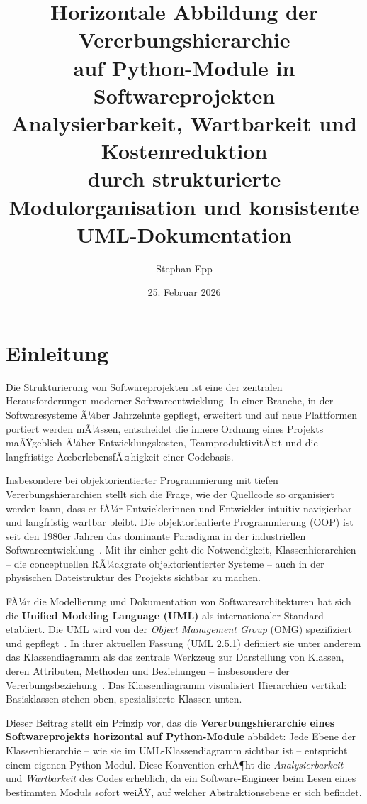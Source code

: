 ﻿\documentclass[a4paper,12pt]{article}
\title{
	\vspace{-1cm}
	\Large\textbf{Horizontale Abbildung der Vererbungshierarchie\\
		auf Python-Module in Softwareprojekten}\\[0.5em]
	\large Analysierbarkeit, Wartbarkeit und Kostenreduktion\\
	durch strukturierte Modulorganisation und konsistente UML-Dokumentation
}
\author{Stephan Epp}
\date{25. Februar 2026}
\begin{document}
	
\maketitle
\tableofcontents
\newpage

\section{Einleitung}

Die Strukturierung von Softwareprojekten ist eine der zentralen Herausforderungen
moderner Softwareentwicklung. In einer Branche, in der Softwaresysteme Ã¼ber
Jahrzehnte gepflegt, erweitert und auf neue Plattformen portiert werden mÃ¼ssen,
entscheidet die innere Ordnung eines Projekts maÃŸgeblich Ã¼ber Entwicklungskosten,
TeamproduktivitÃ¤t und die langfristige ÃœberlebensfÃ¤higkeit einer Codebasis.

Insbesondere bei objektorientierter Programmierung mit tiefen Vererbungshierarchien
stellt sich die Frage, wie der Quellcode so organisiert werden kann, dass er fÃ¼r
Entwicklerinnen und Entwickler intuitiv navigierbar und langfristig wartbar bleibt.
Die objektorientierte Programmierung (OOP) ist seit den 1980er Jahren das dominante
Paradigma in der industriellen Softwareentwicklung~\cite{booch1994}. Mit ihr einher
geht die Notwendigkeit, Klassenhierarchien -- die conceptuellen RÃ¼ckgrate
objektorientierter Systeme -- auch in der physischen Dateistruktur des Projekts
sichtbar zu machen.

FÃ¼r die Modellierung und Dokumentation von Softwarearchitekturen hat sich die
\textbf{Unified Modeling Language (UML)} als internationaler Standard etabliert.
Die UML wird von der \textit{Object Management Group} (OMG) spezifiziert und
gepflegt~\cite{omg2017}. In ihrer aktuellen Fassung (UML 2.5.1) definiert sie unter
anderem das Klassendiagramm als das zentrale Werkzeug zur Darstellung von Klassen,
deren Attributen, Methoden und Beziehungen -- insbesondere der
Vererbungsbeziehung~\cite{omg2017}. Das Klassendiagramm visualisiert Hierarchien
vertikal: Basisklassen stehen oben, spezialisierte Klassen unten.

Dieser Beitrag stellt ein Prinzip vor, das die \textbf{Vererbungshierarchie eines
	Softwareprojekts horizontal auf Python-Module} abbildet: Jede Ebene der
Klassenhierarchie -- wie sie im UML-Klassendiagramm sichtbar ist -- entspricht
einem eigenen Python-Modul. Diese Konvention erhÃ¶ht die
\textit{Analysierbarkeit} und \textit{Wartbarkeit} des Codes erheblich, da ein
Software-Engineer beim Lesen eines bestimmten Moduls sofort weiÃŸ, auf welcher
Abstraktionsebene er sich befindet.
\end{document}
